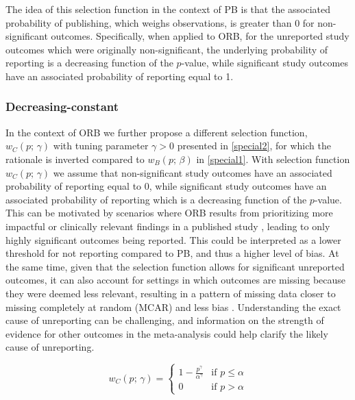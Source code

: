 \documentclass[twocolumn]{article}\usepackage[]{graphicx}\usepackage[]{xcolor}
\begin{document}
The idea of this selection function in the context of PB is that the associated probability of publishing, which weighs observations, is greater than 0 for non-significant outcomes. Specifically, when applied to ORB, for the unreported study outcomes which were originally non-significant, the underlying probability of reporting is a decreasing function of the $p$-value, while significant study outcomes have an associated probability of reporting equal to 1.

\subsubsection{Decreasing-constant}

In the context of ORB we further propose a different selection function, $w_C(p \text{; } \gamma)$ with tuning parameter $\gamma > 0$ presented in \eqref{special2}, for which the rationale is inverted compared to $w_B(p \text{; } \beta)$ in \eqref{special1}. With selection function $w_C(p \text{; } \gamma)$ we assume that non-significant study outcomes have an associated probability of reporting equal to 0, while significant study outcomes have an associated probability of reporting which is a decreasing function of the $p$-value. This can be motivated by scenarios where ORB results from prioritizing more impactful or clinically relevant findings in a published study \citep{moreORBreasons, ORBreasons}, leading to only highly significant outcomes being reported. This could be interpreted as a lower threshold for not reporting compared to PB, and thus a higher level of bias. At the same time, given that the selection function allows for significant unreported outcomes, it can also account for settings in which outcomes are missing because they were deemed less relevant, resulting in a pattern of missing data closer to missing completely at random (MCAR) and less bias \citep{mythesis}. Understanding the exact cause of unreporting can be challenging, and information on the strength of evidence for other outcomes in the meta-analysis could help clarify the likely cause of unreporting.

\bigskip

\begin{equation}
w_C(p \text{; } \gamma) = 
\begin{cases}
1 - \frac{p^{\gamma}}{\alpha^{\gamma}} & \text{if } p \leq \alpha \\
0 & \text{if } p > \alpha
\end{cases}
\label{special2}
\end{equation}
\end{document}
